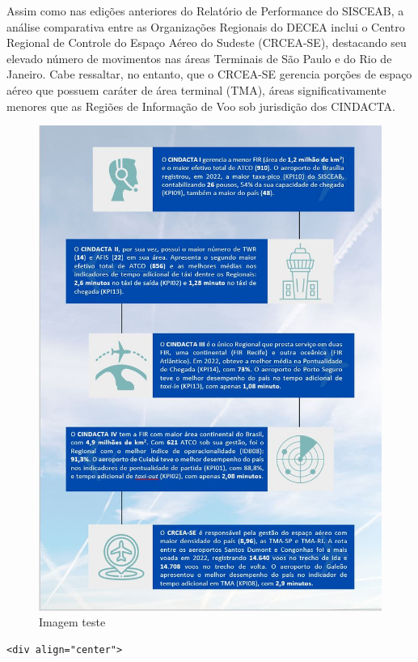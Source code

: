 \documentclass[
]{book}
\theoremstyle{definition}
\theoremstyle{definition}
\theoremstyle{definition}
\theoremstyle{definition}
\theoremstyle{remark}
\begin{document}
Assim como nas edições anteriores do Relatório de Performance do SISCEAB, a análise comparativa entre as Organizações Regionais do DECEA inclui o Centro Regional de Controle do Espaço Aéreo do Sudeste (CRCEA-SE), destacando seu elevado número de movimentos nas áreas Terminais de São Paulo e do Rio de Janeiro. Cabe ressaltar, no entanto, que o CRCEA-SE gerencia porções de espaço aéreo que possuem caráter de área terminal (TMA), áreas significativamente menores que as Regiões de Informação de Voo sob jurisdição dos CINDACTA.

\begin{figure}
\centering
\includegraphics{imagens/fig6.jpg}
\caption{Imagem teste}
\end{figure}

\begin{verbatim}
<div align="center">
\end{verbatim}
\end{document}
